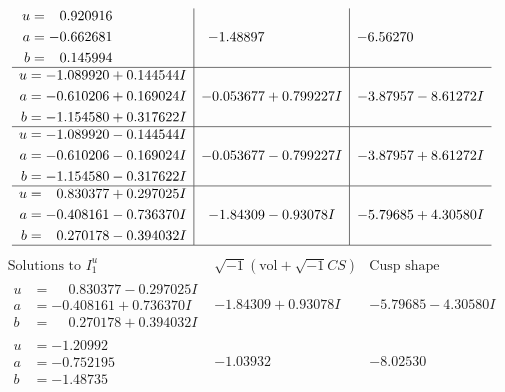\documentclass[1p]{elsarticle_modified}
\theoremstyle{definition}
\newcommand{\I}{\sqrt{-1}}
\begin{document}
$$\begin{array}{c|c|c}
\begin{aligned}
u &= \phantom{-}0.920916\phantom{ +0.000000I} \\
a &= -0.662681\phantom{ +0.000000I} \\
b &= \phantom{-}0.145994\phantom{ +0.000000I}\end{aligned}
 & -1.48897\phantom{ +0.000000I} & -6.56270\phantom{ +0.000000I} \\ \hline\begin{aligned}
u &= -1.089920 + 0.144544 I \\
a &= -0.610206 + 0.169024 I \\
b &= -1.154580 + 0.317622 I\end{aligned}
 & -0.053677 + 0.799227 I & -3.87957 - 8.61272 I \\ \hline\begin{aligned}
u &= -1.089920 - 0.144544 I \\
a &= -0.610206 - 0.169024 I \\
b &= -1.154580 - 0.317622 I\end{aligned}
 & -0.053677 - 0.799227 I & -3.87957 + 8.61272 I \\ \hline\begin{aligned}
u &= \phantom{-}0.830377 + 0.297025 I \\
a &= -0.408161 - 0.736370 I \\
b &= \phantom{-}0.270178 - 0.394032 I\end{aligned}
 & -1.84309 - 0.93078 I & -5.79685 + 4.30580 I\\
 \hline 
 \end{array}$$\newpage$$\begin{array}{c|c|c}  
\text{Solutions to }I^u_{1}& \I (\text{vol} + \sqrt{-1}CS) & \text{Cusp shape}\\
 \hline 
\begin{aligned}
u &= \phantom{-}0.830377 - 0.297025 I \\
a &= -0.408161 + 0.736370 I \\
b &= \phantom{-}0.270178 + 0.394032 I\end{aligned}
 & -1.84309 + 0.93078 I & -5.79685 - 4.30580 I \\ \hline\begin{aligned}
u &= -1.20992\phantom{ +0.000000I} \\
a &= -0.752195\phantom{ +0.000000I} \\
b &= -1.48735\phantom{ +0.000000I}\end{aligned}
 & -1.03932\phantom{ +0.000000I} & -8.02530\phantom{ +0.000000I} \\ \hline\begin{aligned}

\end{aligned}
\end{array}$$
\end{document}

